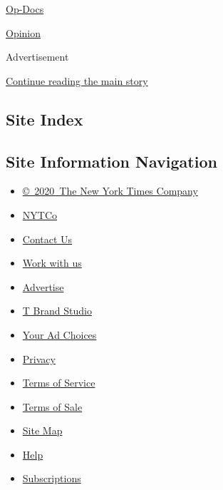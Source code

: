 \href{/video/op-docs}{Op-Docs}

\href{/video/opinion}{Opinion}

Advertisement

\protect\hyperlink{after-bottom}{Continue reading the main story}

\hypertarget{site-index}{%
\subsection{Site Index}\label{site-index}}

\hypertarget{site-information-navigation}{%
\subsection{Site Information
Navigation}\label{site-information-navigation}}

\begin{itemize}
\tightlist
\item
  \href{https://help.nytimes3xbfgragh.onion/hc/en-us/articles/115014792127-Copyright-notice}{©~2020~The
  New York Times Company}
\end{itemize}

\begin{itemize}
\tightlist
\item
  \href{https://www.nytco.com/}{NYTCo}
\item
  \href{https://help.nytimes3xbfgragh.onion/hc/en-us/articles/115015385887-Contact-Us}{Contact
  Us}
\item
  \href{https://www.nytco.com/careers/}{Work with us}
\item
  \href{https://nytmediakit.com/}{Advertise}
\item
  \href{http://www.tbrandstudio.com/}{T Brand Studio}
\item
  \href{https://www.nytimes3xbfgragh.onion/privacy/cookie-policy\#how-do-i-manage-trackers}{Your
  Ad Choices}
\item
  \href{https://www.nytimes3xbfgragh.onion/privacy}{Privacy}
\item
  \href{https://help.nytimes3xbfgragh.onion/hc/en-us/articles/115014893428-Terms-of-service}{Terms
  of Service}
\item
  \href{https://help.nytimes3xbfgragh.onion/hc/en-us/articles/115014893968-Terms-of-sale}{Terms
  of Sale}
\item
  \href{https://spiderbites.nytimes3xbfgragh.onion}{Site Map}
\item
  \href{https://help.nytimes3xbfgragh.onion/hc/en-us}{Help}
\item
  \href{https://www.nytimes3xbfgragh.onion/subscription?campaignId=37WXW}{Subscriptions}
\end{itemize}
